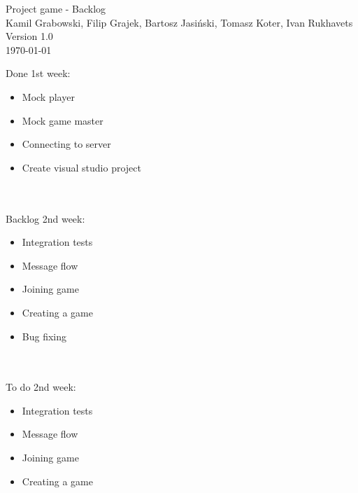 \documentclass[11pt,a4paper]{article}
\begin{document}
\begin{titlepage}
\centering
\huge Project game - Backlog \\
\vspace{1.5cm}
\large Kamil Grabowski, Filip Grajek, Bartosz Jasiński, Tomasz Koter, Ivan Rukhavets \\
\vspace{1.0cm}
Version 1.0 \\
\vspace{1.0cm}
\today
\end{titlepage}

Done 1st week:
\begin{itemize}

\item Mock player
\item Mock game master
\item Connecting to server
\item Create visual studio project
\end{itemize}

\\~\\
Backlog 2nd week:
\begin{itemize}
\item Integration tests
\item Message flow
\item Joining game
\item Creating a game
\item Bug fixing
\end{itemize}

\\~\\
To do 2nd week:
\begin{itemize}
\item Integration tests
\item Message flow 
\item Joining game
\item Creating a game
\end{itemize}
 
\end{document}
